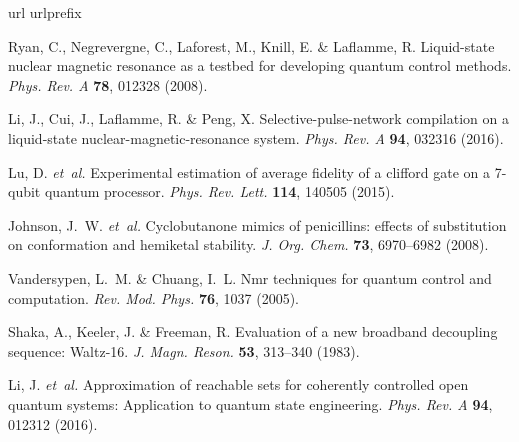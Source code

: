 \documentclass[twocolumn,reprint, amsmath,amssymb,showpacs,superscriptaddress]{revtex4-1}
\begin{document}
\begin{thebibliography}{1}
\expandafter\ifx\csname url\endcsname\relax
  \def\url#1{\texttt{#1}}\fi
\expandafter\ifx\csname urlprefix\endcsname\relax\def\urlprefix{URL }\fi
\providecommand{\bibinfo}[2]{#2}
\providecommand{\eprint}[2][]{\url{#2}}

\bibinfo{author}{Ryan, C.}, \bibinfo{author}{Negrevergne, C.},
  \bibinfo{author}{Laforest, M.}, \bibinfo{author}{Knill, E.} \&
  \bibinfo{author}{Laflamme, R.}
\newblock \bibinfo{title}{Liquid-state nuclear magnetic resonance as a testbed
  for developing quantum control methods}.
\newblock \emph{\bibinfo{journal}{Phys. Rev. A}} \textbf{\bibinfo{volume}{78}},
  \bibinfo{pages}{012328} (\bibinfo{year}{2008}).

\bibinfo{author}{Li, J.}, \bibinfo{author}{Cui, J.}, \bibinfo{author}{Laflamme,
  R.} \& \bibinfo{author}{Peng, X.}
\newblock \bibinfo{title}{Selective-pulse-network compilation on a liquid-state
  nuclear-magnetic-resonance system}.
\newblock \emph{\bibinfo{journal}{Phys. Rev. A}} \textbf{\bibinfo{volume}{94}},
  \bibinfo{pages}{032316} (\bibinfo{year}{2016}).

\bibinfo{author}{Lu, D.} \emph{et~al.}
\newblock \bibinfo{title}{Experimental estimation of average fidelity of a
  clifford gate on a 7-qubit quantum processor}.
\newblock \emph{\bibinfo{journal}{Phys. Rev. Lett.}}
  \textbf{\bibinfo{volume}{114}}, \bibinfo{pages}{140505}
  (\bibinfo{year}{2015}).

\bibinfo{author}{Johnson, J.~W.} \emph{et~al.}
\newblock \bibinfo{title}{Cyclobutanone mimics of penicillins: effects of
  substitution on conformation and hemiketal stability}.
\newblock \emph{\bibinfo{journal}{J. Org. Chem.}}
  \textbf{\bibinfo{volume}{73}}, \bibinfo{pages}{6970--6982}
  (\bibinfo{year}{2008}).

\bibinfo{author}{Vandersypen, L.~M.} \& \bibinfo{author}{Chuang, I.~L.}
\newblock \bibinfo{title}{Nmr techniques for quantum control and computation}.
\newblock \emph{\bibinfo{journal}{Rev. Mod. Phys.}}
  \textbf{\bibinfo{volume}{76}}, \bibinfo{pages}{1037} (\bibinfo{year}{2005}).

\bibinfo{author}{Shaka, A.}, \bibinfo{author}{Keeler, J.} \&
  \bibinfo{author}{Freeman, R.}
\newblock \bibinfo{title}{Evaluation of a new broadband decoupling sequence:
  Waltz-16}.
\newblock \emph{\bibinfo{journal}{J. Magn. Reson.}}
  \textbf{\bibinfo{volume}{53}}, \bibinfo{pages}{313--340}
  (\bibinfo{year}{1983}).

\bibinfo{author}{Li, J.} \emph{et~al.}
\newblock \bibinfo{title}{Approximation of reachable sets for coherently
  controlled open quantum systems: Application to quantum state engineering}.
\newblock \emph{\bibinfo{journal}{Phys. Rev. A}} \textbf{\bibinfo{volume}{94}},
  \bibinfo{pages}{012312} (\bibinfo{year}{2016}).

\end{thebibliography}
\end{document}
